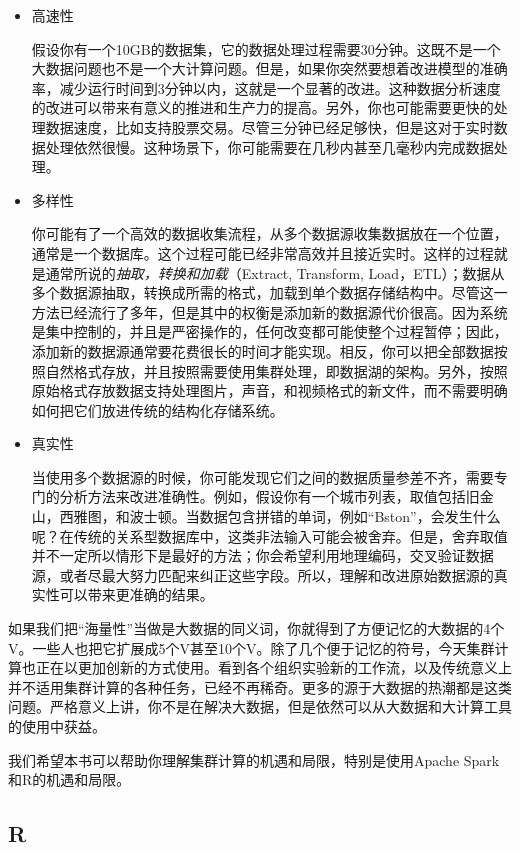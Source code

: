\documentclass[
]{article}
\begin{document}
\begin{itemize}
\item
  高速性

  假设你有一个10GB的数据集，它的数据处理过程需要30分钟。这既不是一个大数据问题也不是一个大计算问题。但是，如果你突然要想着改进模型的准确率，减少运行时间到3分钟以内，这就是一个显著的改进。这种数据分析速度的改进可以带来有意义的推进和生产力的提高。另外，你也可能需要更快的处理数据速度，比如支持股票交易。尽管三分钟已经足够快，但是这对于实时数据处理依然很慢。这种场景下，你可能需要在几秒内甚至几毫秒内完成数据处理。
\item
  多样性

  你可能有了一个高效的数据收集流程，从多个数据源收集数据放在一个位置，通常是一个数据库。这个过程可能已经非常高效并且接近实时。这样的过程就是通常所说的\emph{抽取，转换和加载}（Extract,
  Transform,
  Load，ETL）；数据从多个数据源抽取，转换成所需的格式，加载到单个数据存储结构中。尽管这一方法已经流行了多年，但是其中的权衡是添加新的数据源代价很高。因为系统是集中控制的，并且是严密操作的，任何改变都可能使整个过程暂停；因此，添加新的数据源通常要花费很长的时间才能实现。相反，你可以把全部数据按照自然格式存放，并且按照需要使用集群处理，即数据湖的架构。另外，按照原始格式存放数据支持处理图片，声音，和视频格式的新文件，而不需要明确如何把它们放进传统的结构化存储系统。
\item
  真实性

  当使用多个数据源的时候，你可能发现它们之间的数据质量参差不齐，需要专门的分析方法来改进准确性。例如，假设你有一个城市列表，取值包括旧金山，西雅图，和波士顿。当数据包含拼错的单词，例如``Bston''，会发生什么呢？在传统的关系型数据库中，这类非法输入可能会被舍弃。但是，舍弃取值并不一定所以情形下是最好的方法；你会希望利用地理编码，交叉验证数据源，或者尽最大努力匹配来纠正这些字段。所以，理解和改进原始数据源的真实性可以带来更准确的结果。
\end{itemize}

如果我们把``海量性''当做是大数据的同义词，你就得到了方便记忆的大数据的4个V。一些人也把它扩展成5个V甚至10个V。除了几个便于记忆的符号，今天集群计算也正在以更加创新的方式使用。看到各个组织实验新的工作流，以及传统意义上并不适用集群计算的各种任务，已经不再稀奇。更多的源于大数据的热潮都是这类问题。严格意义上讲，你不是在解决大数据，但是依然可以从大数据和大计算工具的使用中获益。

我们希望本书可以帮助你理解集群计算的机遇和局限，特别是使用Apache
Spark和R的机遇和局限。

\hypertarget{r}{%
\subsection{R}\label{r}}
\end{document}
